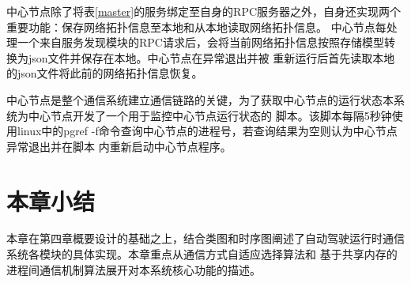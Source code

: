 中心节点除了将表\ref{master}的服务绑定至自身的RPC服务器之外，自身还实现两个重要功能：保存网络拓扑信息至本地和从本地读取网络拓扑信息。
中心节点每处理一个来自服务发现模块的RPC请求后，会将当前网络拓扑信息按照存储模型转换为json文件并保存在本地。中心节点在异常退出并被
重新运行后首先读取本地的json文件将此前的网络拓扑信息恢复。

中心节点是整个通信系统建立通信链路的关键，为了获取中心节点的运行状态本系统为中心节点开发了一个用于监控中心节点运行状态的
脚本。该脚本每隔5秒钟使用linux中的pgref -f命令查询中心节点的进程号，若查询结果为空则认为中心节点异常退出并在脚本
内重新启动中心节点程序。

\section{本章小结}
本章在第四章概要设计的基础之上，结合类图和时序图阐述了自动驾驶运行时通信系统各模块的具体实现。本章重点从通信方式自适应选择算法和
基于共享内存的进程间通信机制算法展开对本系统核心功能的描述。


